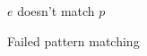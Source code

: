 \begin{figure}[h]
{$e$ doesn't match $p$}

\begin{mathpar}





\end{mathpar}
\caption{Failed pattern matching}
\label{fig:failmatch}
\end{figure}
